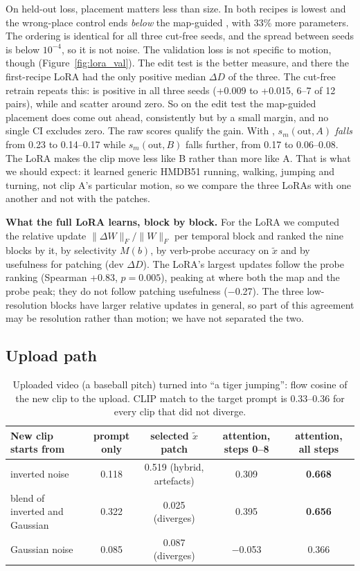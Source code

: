 \documentclass[twoside,english]{article}
\newcommand{\xd}{\tilde{x}}       %
\newcommand{\dD}{\Delta D}
\begin{document}
On held-out loss, placement matters less than size. In both recipes  is lowest and the
wrong-place control  ends \emph{below} the map-guided , with 33\% more
parameters. The ordering is identical for all three cut-free seeds, and the spread between seeds is
below $10^{-4}$, so it is not noise. The validation loss is not specific to motion, though
(Figure~\ref{fig:lora_val}). The edit test is the better measure, and there the first-recipe
 LoRA had the only positive median $\dD$ of the three. The cut-free retrain repeats
this:  is positive in all three seeds (+0.009 to +0.015, 6--7 of 12 pairs), while
 and  scatter around zero. So on the edit test the map-guided placement does
come out ahead, consistently but by a small margin, and no single CI excludes zero. The raw scores
qualify the gain. With , $s_m(\text{out},A)$ \emph{falls} from 0.23 to 0.14--0.17 while
$s_m(\text{out},B)$ falls further, from 0.17 to 0.06--0.08. The LoRA makes the clip move less like B
rather than more like A. That is what we should expect: it learned generic HMDB51 running,
walking, jumping and turning, not clip A's particular motion, so we compare the three LoRAs with one
another and not with the patches.

\textbf{What the full LoRA learns, block by block.} For the  LoRA we computed the relative
update $\|\Delta W\|_F / \|W\|_F$ per temporal block and ranked the nine blocks by it, by selectivity
$M(b)$, by verb-probe accuracy on $\xd$ and by usefulness for patching (dev $\dD$). The LoRA's largest
updates follow the probe ranking (Spearman +0.83, $p = 0.005$), peaking at  where
both the map and the probe peak; they do not follow patching usefulness ($-$0.27). The three
low-resolution blocks have larger relative updates in general, so part of this agreement may be
resolution rather than motion; we have not separated the two.

\subsection{Upload path} \label{sec:res_upload}

\begin{table}[!h]
\centering
\small
\begin{tabular}{lcccc}
\toprule
New clip starts from & prompt only & selected $\xd$ patch & attention, steps 0--8 & attention, all steps \\
\midrule
inverted noise & 0.118 & 0.519 (hybrid, artefacts) & 0.309 & \textbf{0.668} \\
blend of inverted and Gaussian & 0.322 & 0.025 (diverges) & 0.395 & \textbf{0.656} \\
Gaussian noise & 0.085 & 0.087 (diverges) & $-$0.053 & 0.366 \\
\bottomrule
\end{tabular}
\caption{Uploaded video (a baseball pitch) turned into ``a tiger jumping'': flow cosine of the new clip
to the upload. CLIP match to the target prompt is 0.33--0.36 for every clip that did not diverge.}
\label{tab:upload}
\end{table}
\end{document}
